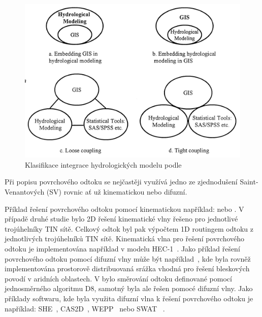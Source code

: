 \begin{figure}
  \centering
  \includegraphics[width=\linewidth]{./img/klasifikaceGISHyd.png}
  \caption{Klasifikace integrace hydrologických modelu podle~\cite{sui1999}}
  \label{fig:klasGISHyd}
\end{figure}

Při popisu povrchového odtoku se nejčastěji využívá jedno ze zjednodušení Saint-Venantových (SV) rovnic ať už kinematickou nebo difuzní. 

Příklad řešení povrchového odtoku pomocí kinematickou například: \cite{taylor1974} nebo \cite{goodrich1991}. V případě druhé studie bylo 2D řešení kinematické vlny řešeno pro jednotlivé trojúhelníky TIN sítě. Celkový odtok byl pak výpočtem 1D routingem odtoku z jednotlivých trojúhelníků TIN sítě. Kinematická vlna pro řešení povrchového odtoku je implementována například v modelu HEC-1~\citep{macarthur1993}. Jako příklad řešení povrchového odtoku pomocí difuzní vlny může být například~\cite{julien1995}, kde byla rovněž implementována prostorově distribuovaná srážka vhodná pro řešení bleskových povodí v aridních oblastech. V \cite{jain2004} bylo směrování odtoku definované pomocí jednosměrného algoritmu D8, samotný byla ale řešen pomocé difuzní vlny. Jako příklady softwaru, kde byla využita difuzní vlna k řešení povrchového odtoku je například: SHE~\cite{abbott1986_1, abbott1986_2}, CAS2D~\cite{julien1995}, WEPP~\citep{flanagan2010} nebo SWAT ~\citep{USDA}. 








